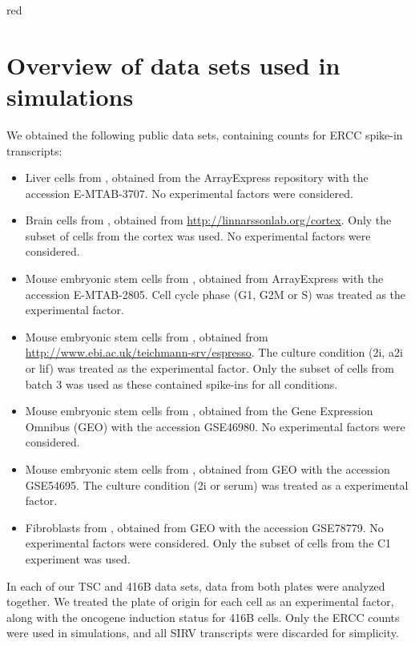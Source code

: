 \documentclass{article}
\begin{document}
\begin{color}{red}
\section{Overview of data sets used in simulations}
\label{sec:datasets}
We obtained the following public data sets, containing counts for ERCC spike-in transcripts:
\begin{itemize}
    \item Liver cells from \cite{scialdone2015computational}, obtained from the ArrayExpress repository with the accession E-MTAB-3707.
        No experimental factors were considered.
    \item Brain cells from \cite{zeisel2015brain}, obtained from \url{http://linnarssonlab.org/cortex}.
        Only the subset of cells from the cortex was used.
        No experimental factors were considered.
    \item Mouse embryonic stem cells from \cite{buettner2015computational}, obtained from ArrayExpress with the accession E-MTAB-2805.
        Cell cycle phase (G1, G2M or S) was treated as the experimental factor.
    \item Mouse embryonic stem cells from \cite{kolod2015single}, obtained from \url{http://www.ebi.ac.uk/teichmann-srv/espresso}.
        The culture condition (2i, a2i or lif) was treated as the experimental factor.
        Only the subset of cells from batch 3 was used as these contained spike-ins for all conditions.
    \item Mouse embryonic stem cells from \cite{islam2014quantitative}, obtained from the Gene Expression Omnibus (GEO) with the accession GSE46980.
        No experimental factors were considered.
    \item Mouse embryonic stem cells from \cite{grun2014validation}, obtained from GEO with the accession GSE54695.
        The culture condition (2i or serum) was treated as a experimental factor.
    \item Fibroblasts from \cite{hashimshony2016celseq2}, obtained from GEO with the accession GSE78779.
        No experimental factors were considered.
        Only the subset of cells from the C1 experiment was used.
\end{itemize}
In each of our TSC and 416B data sets, data from both plates were analyzed together.
We treated the plate of origin for each cell as an experimental factor, along with the oncogene induction status for 416B cells.
Only the ERCC counts were used in simulations, and all SIRV transcripts were discarded for simplicity.
\end{color}
\end{document}
